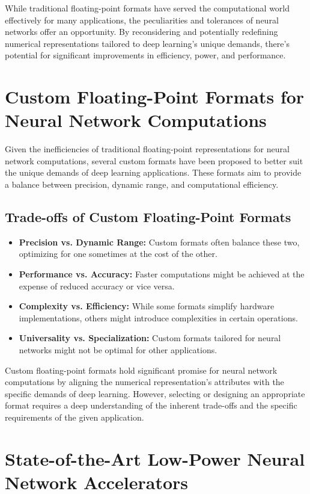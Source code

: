 While traditional floating-point formats have served the computational world effectively for many applications, the peculiarities and tolerances of neural networks offer an opportunity. By reconsidering and potentially redefining numerical representations tailored to deep learning's unique demands, there's potential for significant improvements in efficiency, power, and performance.

\section{Custom Floating-Point Formats for Neural Network Computations}

Given the inefficiencies of traditional floating-point representations for neural network computations, several custom formats have been proposed to better suit the unique demands of deep learning applications. These formats aim to provide a balance between precision, dynamic range, and computational efficiency.


\subsection{Trade-offs of Custom Floating-Point Formats}

\begin{itemize}
	\item \textbf{Precision vs. Dynamic Range:} Custom formats often balance these two, optimizing for one sometimes at the cost of the other.
	\item \textbf{Performance vs. Accuracy:} Faster computations might be achieved at the expense of reduced accuracy or vice versa.
	\item \textbf{Complexity vs. Efficiency:} While some formats simplify hardware implementations, others might introduce complexities in certain operations.
	\item \textbf{Universality vs. Specialization:} Custom formats tailored for neural networks might not be optimal for other applications.
\end{itemize}

Custom floating-point formats hold significant promise for neural network computations by aligning the numerical representation's attributes with the specific demands of deep learning. However, selecting or designing an appropriate format requires a deep understanding of the inherent trade-offs and the specific requirements of the given application.


\section{State-of-the-Art Low-Power Neural Network Accelerators}

